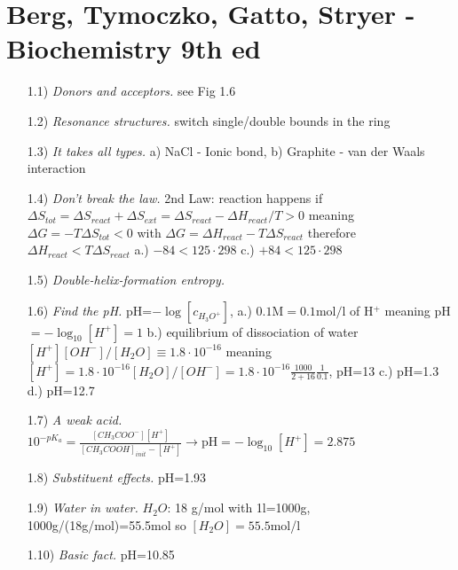 \documentclass[../main.tex]{subfiles}
\begin{document}
\section{{\sc  Berg, Tymoczko, Gatto, Stryer} -  Biochemistry 9th ed}

\begin{enumerate}
\item[1.1)] {\it Donors and acceptors.} see Fig 1.6
\item[1.2)] {\it Resonance structures.} switch single/double bounds in the ring
\item[1.3)] {\it It takes all types.} a) NaCl - Ionic bond, b) Graphite - van der Waals interaction
\item[1.4)] {\it Don’t break the law.} 2nd Law: reaction happens if $\Delta S_{tot}=\Delta S_{react}+\Delta S_{ext}=\Delta S_{react}-\Delta H_{react}/T>0$ meaning $\Delta G=-T\Delta S_{tot}<0$ with $\Delta G=\Delta H_{react}-T\Delta S_{react}$ therefore $\Delta H_{react}<T\Delta S_{react}$ a.) $-84<125\cdot298$ c.) $+84<125\cdot298$
\item[1.5)] {\it Double-helix-formation entropy.}
\item[1.6)] {\it Find the pH.} pH=$-\log[c_{H_3O^+}]$, a.) $0.1\text{M}=0.1\text{mol/l}$ of H$^+$ meaning pH$=-\log_{10}[H^+]=1$ b.) equilibrium of dissociation of water $[H^{+}][OH^{-}]/[H_2O]\equiv1.8\cdot 10^{-16}$ meaning $[H^{+}]=1.8\cdot 10^{-16}[H_2O]/[OH^{-}]=1.8\cdot 10^{-16}\frac{1000}{2+16}\frac{1}{0.1}$, pH=13 c.) pH=1.3 d.) pH=12.7
\item[1.7)] {\it A weak acid.} $10^{-pK_a}=\frac{[CH_3COO^-][H^{+}]}{[CH_3COOH]_{init}-[H^{+}]}\rightarrow\text{pH}=-\log_{10}[H^+]=2.875$
\item[1.8)] {\it Substituent eﬀects.} pH=1.93
\item[1.9)] {\it Water in water.} $H_2O$: 18 g/mol with 1l=1000g, 1000g/(18g/mol)=55.5mol so $[H_2O]=55.5$mol/l
\item[1.10)] {\it Basic fact.} pH=10.85
\end{enumerate}
\end{document}
